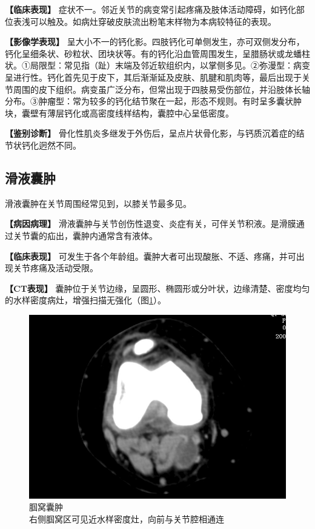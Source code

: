 \textbf{【临床表现】}
症状不一。邻近关节的病变常引起疼痛及肢体活动障碍，如钙化部位表浅可以触及。如病灶穿破皮肤流出粉笔末样物为本病较特征的表现。

\textbf{【影像学表现】}
呈大小不一的钙化影。四肢钙化可单侧发生，亦可双侧发分布，钙化呈细条状、砂粒状、团块状等。有的钙化沿血管周围发生，呈腊肠状或龙蟠柱状。①局限型：常见指（趾）末端及邻近软组织内，以掌侧多见。②弥漫型：病变呈进行性。钙化首先见于皮下，其后渐渐延及皮肤、肌腱和肌肉等，最后出现于关节周围的皮下组织。病变虽广泛分布，但常出现于四肢易受伤部位，并沿肢体长轴分布。③肿瘤型：常为较多的钙化结节聚在一起，形态不规则。有时呈多囊状肿块，囊壁有薄层钙化或高密度线样结构，囊腔中心呈低密度。

\textbf{【鉴别诊断】}
骨化性肌炎多继发于外伤后，呈点片状骨化影，与钙质沉着症的结节状钙化迥然不同。

\subsection{滑液囊肿}

滑液囊肿在关节周围经常见到，以膝关节最多见。

\textbf{【病因病理】}
滑液囊肿与关节创伤性退变、炎症有关，可伴关节积液。是滑膜通过关节囊的疝出，囊肿内通常含有液体。

\textbf{【临床表现】}
可发生于各个年龄组。囊肿大者可出现酸胀、不适、疼痛，并可出现关节疼痛及活动受限。

\textbf{【CT表现】}
囊肿位于关节边缘，呈圆形、椭圆形或分叶状，边缘清楚、密度均匀的水样密度病灶，增强扫描无强化（图\ref{fig22-27}）。

\begin{figure}[!htbp]
 \centering
 \includegraphics[width=.7\textwidth,height=\textheight,keepaspectratio]{./images/Image00452.jpg}
 \captionsetup{justification=centering}
 \caption{腘窝囊肿\\{\small 右侧腘窝区可见近水样密度灶，向前与关节腔相通连}}
 \label{fig22-27}
  \end{figure} 

